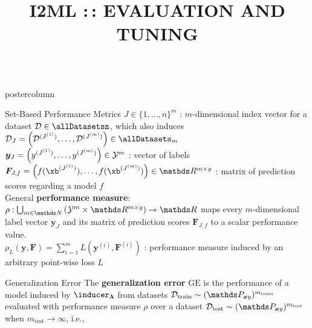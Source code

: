 \documentclass{beamer}
\title{I2ML :\,: EVALUATION AND TUNING} %
\newlength{\columnheight} %
\begin{document}
\begin{frame}[fragile]{}
\vspace{-8ex}
\begin{columns}
	\begin{column}{.31\textwidth}
		\begin{beamercolorbox}[center]{postercolumn}
			\begin{minipage}{.98\textwidth}
				\parbox[t][\columnheight]{\textwidth}{
\begin{myblock}{Set-Based Performance Metrics}
$J \in \{1,\dots,n\}^m$ : $m$-dimensional index vector for a dataset $\D \in 
\allDatasetsn$, which also induces 
$\D_J = \left(\D^{(J^{(1)})},\dots,\D^{(J^{(m)})}\right) \in \allDatasets_m$\\


$\boldsymbol{y}_J = \left(y^{(J^{(1)})},\dots,y^{(J^{(m)})}\right) \in \mathcal{Y}^m$ :
vector of labels\\

$\boldsymbol{F}_{J,f} = \left(f(\xb^{(J^{(1)})}),\dots, f(\xb^{(J^{(m)})})\right) 
\in \R^{m\times g}$ : matrix of prediction scores regarding a model $f$\\

General \textbf{performance measure}: $\rho: \bigcup_{m\in\N}\left(\Yspace^m\times\R^{m\times g}\right)  \rightarrow \R$ maps every $m$-dimensional label vector $\boldsymbol{y}_J$ and its matrix of prediction scores $\boldsymbol{F}_{J,f}$ to a scalar performance value.\\

$\rho_L (\boldsymbol{y}, \boldsymbol{F}) = \sum_{i=1}^m L(\boldsymbol{y}^{(i)}, \boldsymbol{F}^{(i)})$ : performance measure induced by an arbitrary point-wise loss $L$
\end{myblock}
\begin{myblock}{Generalization Error}
The \textbf{generalization error} $\mathrm{GE}$ is the performance of a model induced by $\inducer_{\boldsymbol{\lambda}}$ from datasets $\Dtrain \sim (\P_{\xv y})^{m_{\mathrm{train}}}$ evaluated with performance measure $\rho$ over a dataset $\Dtest \sim (\P_{\xv y})^{m_{\mathrm{test}}}$ when $m_{\mathrm{test}}\rightarrow\infty$, i.e.,\\


\end{myblock}}
\end{minipage}
\end{beamercolorbox}
\end{column}
\end{columns}
\end{frame}
\end{document}

